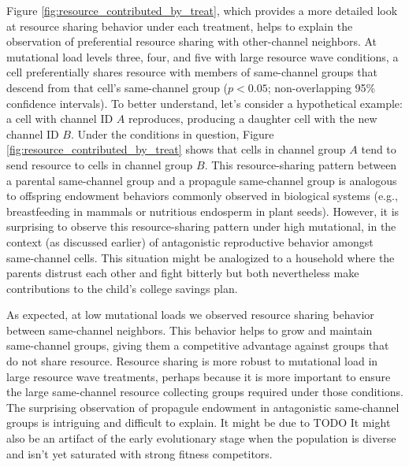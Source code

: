 Figure \ref{fig:resource_contributed_by_treat}, which provides a more detailed look at resource sharing behavior under each treatment, helps to explain the observation of preferential resource sharing with other-channel neighbors.
At mutational load levels three, four, and five with large resource wave conditions, a cell preferentially shares resource with members of same-channel groups that descend from that cell's same-channel group ($p < 0.05$; non-overlapping 95\% confidence intervals).
To better understand, let's consider a hypothetical example: a cell with channel ID $A$ reproduces, producing a daughter cell with the new channel ID $B$.
Under the conditions in question, Figure \ref{fig:resource_contributed_by_treat} shows that cells in channel group $A$ tend to send resource to cells in channel group $B$.
This resource-sharing pattern between a parental same-channel group and a propagule same-channel group is analogous to offspring endowment behaviors commonly observed in biological systems (e.g., breastfeeding in mammals or nutritious endosperm in plant seeds).
However, it is surprising to observe this resource-sharing pattern under high mutational, in the context (as discussed earlier) of antagonistic reproductive behavior amongst same-channel cells.
This situation might be analogized to a household where the parents distrust each other and fight bitterly but both nevertheless make contributions to the child's college savings plan.

As expected, at low mutational loads we observed resource sharing behavior between same-channel neighbors.
This behavior helps to grow and maintain same-channel groups, giving them a competitive advantage against groups that do not share resource.
Resource sharing is more robust to mutational load in large resource wave treatments, perhaps because it is more important to ensure the large same-channel resource collecting groups required under those conditions.
The surprising observation of propagule endowment in antagonistic same-channel groups is intriguing and difficult to explain.
It might be due to TODO
It might also be an artifact of the early evolutionary stage when the population is diverse and isn't yet saturated with strong fitness competitors.
